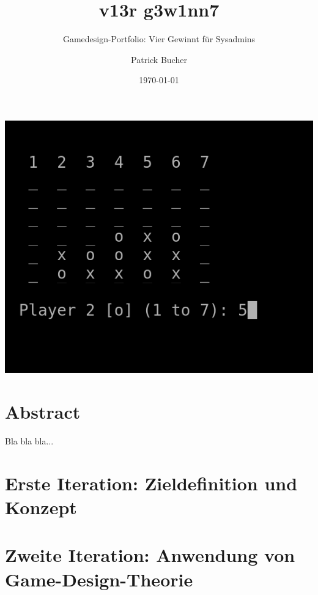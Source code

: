 \documentclass[a4paper,11pt,hidelinks]{scrartcl}
\begin{document}
\author{Patrick Bucher}
\title{v13r g3w1nn7}
\subtitle{Gamedesign-Portfolio: Vier Gewinnt für Sysadmins}
\date{\today}
\maketitle
\thispagestyle{empty}

\begin{center}
    \includegraphics[width=0.5\linewidth]{pics/title.png}
\end{center}

\section*{Abstract}
Bla bla bla...
\newpage

\tableofcontents
\newpage

\section{Erste Iteration: Zieldefinition und Konzept}
\newpage

\section{Zweite Iteration: Anwendung von Game-Design-Theorie}
\newpage
\end{document}
